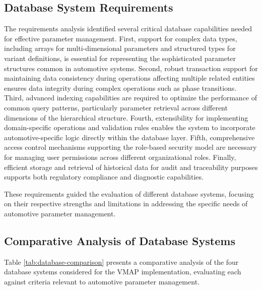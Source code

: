 \subsection{Database System Requirements}
\label{subsec:database-requirements}

The requirements analysis identified several critical database capabilities needed for effective parameter management. First, support for complex data types, including arrays for multi-dimensional parameters and structured types for variant definitions, is essential for representing the sophisticated parameter structures common in automotive systems. Second, robust transaction support for maintaining data consistency during operations affecting multiple related entities ensures data integrity during complex operations such as phase transitions. Third, advanced indexing capabilities are required to optimize the performance of common query patterns, particularly parameter retrieval across different dimensions of the hierarchical structure. Fourth, extensibility for implementing domain-specific operations and validation rules enables the system to incorporate automotive-specific logic directly within the database layer. Fifth, comprehensive access control mechanisms supporting the role-based security model are necessary for managing user permissions across different organizational roles. Finally, efficient storage and retrieval of historical data for audit and traceability purposes supports both regulatory compliance and diagnostic capabilities.

These requirements guided the evaluation of different database systems, focusing on their respective strengths and limitations in addressing the specific needs of automotive parameter management.

\subsection{Comparative Analysis of Database Systems}
\label{subsec:database-comparison}

Table \ref{tab:database-comparison} presents a comparative analysis of the four database systems considered for the \ac{VMAP} implementation, evaluating each against criteria relevant to automotive parameter management.


